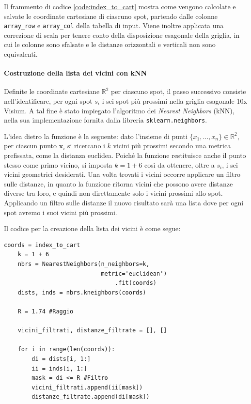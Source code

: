 \noindent
Il frammento di codice \ref{code:index_to_cart} mostra come vengono calcolate e salvate le coordinate cartesiane di ciascuno spot,
partendo dalle colonne \texttt{array\_row} e \texttt{array\_col} della tabella di input. 
Viene inoltre applicata una correzione di scala per tenere conto della disposizione esagonale della griglia,
in cui le colonne sono sfalsate e le distanze orizzontali e verticali non sono equivalenti.

\paragraph{Costruzione della lista dei vicini con k\text{-}NN \\}
Definite le coordinate cartesiane $\mathbb{R}^2$ per ciascuno spot, 
il passo successivo consiste nell'identificare, per ogni spot $s_i$ 
i sei spot più prossimi nella griglia esagonale 10x Visium. 
A tal fine è stato impiegato l'algoritmo dei \textit{Nearest Neighbors} (k\text{-}NN), 
nella sua implementazione fornita dalla libreria \texttt{sklearn.neighbors}.

L'idea dietro la funzione è la seguente: dato l'insieme di punti $\{x_1, ..., x_n\} \in \mathbb{R}^2$, 
per ciascun punto $\mathbf{x}_i$ si ricercano i $k$ vicini
più prossimi secondo una metrica prefissata, come la distanza euclidea. 
Poiché la funzione restituisce anche il punto stesso 
come primo vicino, si imposta $k = 1+6$ così da ottenere, 
oltre a $s_i$, i sei vicini geometrici desiderati.
Una volta trovati i vicini occorre applicare un filtro sulle distanze, in quanto la funzione 
ritorna vicini che possono avere distanze diverse tra loro, e quindi non direttamente solo i vicini prossimi 
allo spot.
Applicando un filtro sulle distanze il nuovo risultato sarà una lista dove per ogni spot avremo i suoi vicini più prossimi.

Il codice per la creazione della lista dei vicini è come segue:
\begin{lstlisting}[style=mypython,
                   label=code:NN,
                   caption={Creazione della lista dei vicini per ogni spot},
                   basicstyle=\ttfamily\scriptsize]
    coords = index_to_cart
    k = 1 + 6
    nbrs = NearestNeighbors(n_neighbors=k, 
                            metric='euclidean')
                                .fit(coords)
    dists, inds = nbrs.kneighbors(coords)

    R = 1.74 #Raggio

    vicini_filtrati, distanze_filtrate = [], []

    for i in range(len(coords)):
        di = dists[i, 1:]
        ii = inds[i, 1:]
        mask = di <= R #Filtro
        vicini_filtrati.append(ii[mask])
        distanze_filtrate.append(di[mask])
\end{lstlisting}

